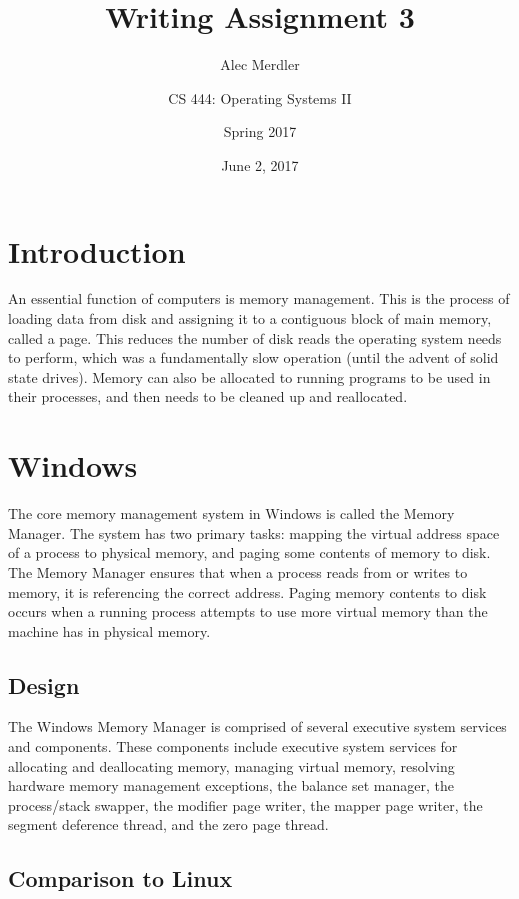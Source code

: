 \documentclass[letterpaper,draftclsnofoot,10pt,onecolumn,titlepage]{IEEEtran}\usepackage[margin=0.75in]{geometry}
\title{Writing Assignment 3}
\author{
	Alec Merdler\\
	\and
	CS 444: Operating Systems II\\
	\and
	Spring 2017\\
}
\date{June 2, 2017}
\begin{document}
\begin{titlepage}
\clearpage\maketitle
\thispagestyle{empty}

\maketitle
\end{titlepage}

\section{Introduction}
An essential function of computers is memory management. This is the process of loading data from disk and assigning
it to a contiguous block of main memory, called a page. This reduces the number of disk reads the operating system 
needs to perform, which was a fundamentally slow operation (until the advent of solid state drives). Memory can 
also be allocated to running programs to be used in their processes, and then needs to be cleaned up and 
reallocated.

\section{Windows}
The core memory management system in Windows is called the Memory Manager. The system has two primary tasks: mapping 
the virtual address space of a process to physical memory, and paging some contents of memory to disk. The Memory 
Manager ensures that when a process reads from or writes to memory, it is referencing the correct address. Paging 
memory contents to disk occurs when a running process attempts to use more virtual memory than the machine
has in physical memory.

\subsection{Design}
The Windows Memory Manager is comprised of several executive system services and components. These components 
include executive system services for allocating and deallocating memory, managing virtual 
memory, resolving hardware memory management exceptions, the balance set manager, the process/stack swapper, 
the modifier page writer, the mapper page writer, the segment deference thread, and the zero page thread.

\subsection{Comparison to Linux}
\end{document}
